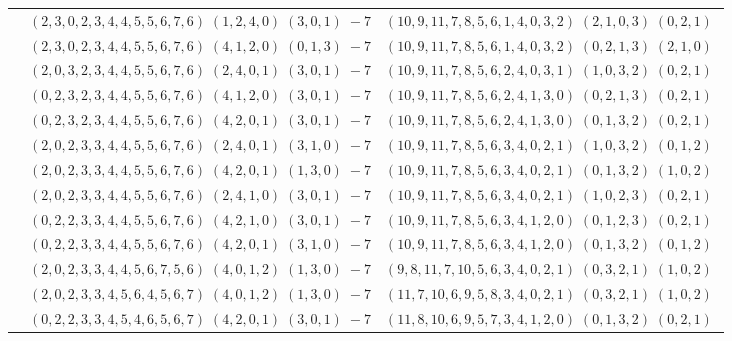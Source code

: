 \documentclass[11pt]{article}
\begin{document}
\begin{longtable}[l]{|c|c|c|}
 \cline{2-3} 
 & $(2 ,3 ,0 ,2 ,3 ,4 ,4 ,5 ,5 ,6 ,7 ,6) \;(1 ,2 ,4 ,0) \;(3 ,0 ,1) \;-7$ & $(10 ,9 ,11 ,7 ,8 ,5 ,6 ,1 ,4 ,0 ,3 ,2) \;(2 ,1 ,0 ,3) \;(0 ,2 ,1) \;$\\ 
 \cline{2-3} 
 & $(2 ,3 ,0 ,2 ,3 ,4 ,4 ,5 ,5 ,6 ,7 ,6) \;(4 ,1 ,2 ,0) \;(0 ,1 ,3) \;-7$ & $(10 ,9 ,11 ,7 ,8 ,5 ,6 ,1 ,4 ,0 ,3 ,2) \;(0 ,2 ,1 ,3) \;(2 ,1 ,0) \;$\\ 
 \cline{2-3} 
 & $(2 ,0 ,3 ,2 ,3 ,4 ,4 ,5 ,5 ,6 ,7 ,6) \;(2 ,4 ,0 ,1) \;(3 ,0 ,1) \;-7$ & $(10 ,9 ,11 ,7 ,8 ,5 ,6 ,2 ,4 ,0 ,3 ,1) \;(1 ,0 ,3 ,2) \;(0 ,2 ,1) \;$\\ 
 \cline{2-3} 
 & $(0 ,2 ,3 ,2 ,3 ,4 ,4 ,5 ,5 ,6 ,7 ,6) \;(4 ,1 ,2 ,0) \;(3 ,0 ,1) \;-7$ & $(10 ,9 ,11 ,7 ,8 ,5 ,6 ,2 ,4 ,1 ,3 ,0) \;(0 ,2 ,1 ,3) \;(0 ,2 ,1) \;$\\ 
 \cline{2-3} 
 & $(0 ,2 ,3 ,2 ,3 ,4 ,4 ,5 ,5 ,6 ,7 ,6) \;(4 ,2 ,0 ,1) \;(3 ,0 ,1) \;-7$ & $(10 ,9 ,11 ,7 ,8 ,5 ,6 ,2 ,4 ,1 ,3 ,0) \;(0 ,1 ,3 ,2) \;(0 ,2 ,1) \;$\\ 
 \cline{2-3} 
 & $(2 ,0 ,2 ,3 ,3 ,4 ,4 ,5 ,5 ,6 ,7 ,6) \;(2 ,4 ,0 ,1) \;(3 ,1 ,0) \;-7$ & $(10 ,9 ,11 ,7 ,8 ,5 ,6 ,3 ,4 ,0 ,2 ,1) \;(1 ,0 ,3 ,2) \;(0 ,1 ,2) \;$\\ 
 \cline{2-3} 
 & $(2 ,0 ,2 ,3 ,3 ,4 ,4 ,5 ,5 ,6 ,7 ,6) \;(4 ,2 ,0 ,1) \;(1 ,3 ,0) \;-7$ & $(10 ,9 ,11 ,7 ,8 ,5 ,6 ,3 ,4 ,0 ,2 ,1) \;(0 ,1 ,3 ,2) \;(1 ,0 ,2) \;$\\ 
 \cline{2-3} 
 & $(2 ,0 ,2 ,3 ,3 ,4 ,4 ,5 ,5 ,6 ,7 ,6) \;(2 ,4 ,1 ,0) \;(3 ,0 ,1) \;-7$ & $(10 ,9 ,11 ,7 ,8 ,5 ,6 ,3 ,4 ,0 ,2 ,1) \;(1 ,0 ,2 ,3) \;(0 ,2 ,1) \;$\\ 
 \cline{2-3} 
 & $(0 ,2 ,2 ,3 ,3 ,4 ,4 ,5 ,5 ,6 ,7 ,6) \;(4 ,2 ,1 ,0) \;(3 ,0 ,1) \;-7$ & $(10 ,9 ,11 ,7 ,8 ,5 ,6 ,3 ,4 ,1 ,2 ,0) \;(0 ,1 ,2 ,3) \;(0 ,2 ,1) \;$\\ 
 \cline{2-3} 
 & $(0 ,2 ,2 ,3 ,3 ,4 ,4 ,5 ,5 ,6 ,7 ,6) \;(4 ,2 ,0 ,1) \;(3 ,1 ,0) \;-7$ & $(10 ,9 ,11 ,7 ,8 ,5 ,6 ,3 ,4 ,1 ,2 ,0) \;(0 ,1 ,3 ,2) \;(0 ,1 ,2) \;$\\ 
 \cline{2-3} 
 & $(2 ,0 ,2 ,3 ,3 ,4 ,4 ,5 ,6 ,7 ,5 ,6) \;(4 ,0 ,1 ,2) \;(1 ,3 ,0) \;-7$ & $(9 ,8 ,11 ,7 ,10 ,5 ,6 ,3 ,4 ,0 ,2 ,1) \;(0 ,3 ,2 ,1) \;(1 ,0 ,2) \;$\\ 
 \cline{2-3} 
 & $(2 ,0 ,2 ,3 ,3 ,4 ,5 ,6 ,4 ,5 ,6 ,7) \;(4 ,0 ,1 ,2) \;(1 ,3 ,0) \;-7$ & $(11 ,7 ,10 ,6 ,9 ,5 ,8 ,3 ,4 ,0 ,2 ,1) \;(0 ,3 ,2 ,1) \;(1 ,0 ,2) \;$\\ 
 \cline{2-3} 
 & $(0 ,2 ,2 ,3 ,3 ,4 ,5 ,4 ,6 ,5 ,6 ,7) \;(4 ,2 ,0 ,1) \;(3 ,0 ,1) \;-7$ & $(11 ,8 ,10 ,6 ,9 ,5 ,7 ,3 ,4 ,1 ,2 ,0) \;(0 ,1 ,3 ,2) \;(0 ,2 ,1) \;$\\ 

\end{longtable}
\end{document}
